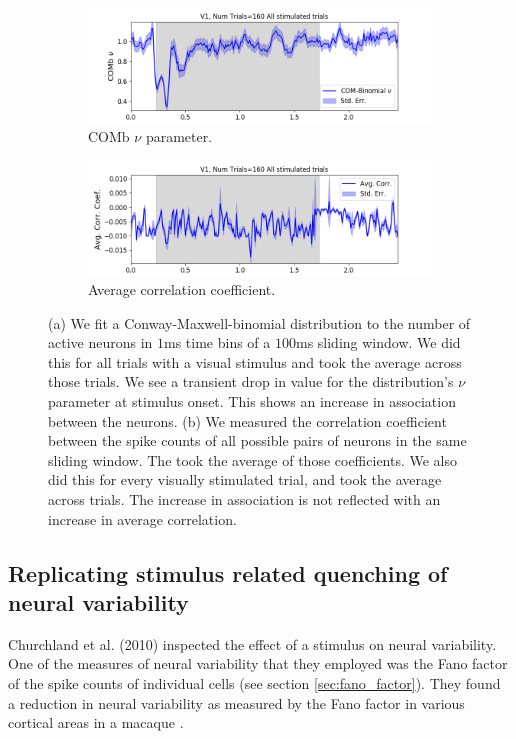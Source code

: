 \documentclass[a4paper,12pt]{article}
\theoremstyle{definition}
\begin{document}
  \newpage

  \begin{figure}[h]
    \begin{subfigure}[h]{\linewidth}
      \includegraphics[width=\linewidth]{figures/v1_1ms_comb_nu_all_stimulated_trials.png}
      \caption{COMb $\nu$ parameter.}
      \label{fig:comb_nu_parameter}
    \end{subfigure}
    \begin{subfigure}[h]{\linewidth}
      \includegraphics[width=\linewidth]{figures/v1_1ms_corr_avg_all_stimulated_trials.png}
      \caption{Average correlation coefficient.}
      \label{fig:avg_corr_coef}
    \end{subfigure}
    \caption{(a) We fit a Conway-Maxwell-binomial distribution to the number of active neurons in $1$ms time bins of a $100$ms sliding window. We did this for all trials with a visual stimulus and took the average across those trials. We see a transient drop in value for the distribution's $\nu$ parameter at stimulus onset. This shows an increase in association between the neurons. (b) We measured the correlation coefficient between the spike counts of all possible pairs of neurons in the same sliding window. The took the average of those coefficients. We also did this for every visually stimulated trial, and took the average across trials. The increase in association is not reflected with an increase in average correlation.}
    \label{fig:comb_nu_and_corr}
  \end{figure}

  \newpage

  \subsection{Replicating stimulus related quenching of neural variability}
  Churchland et al. (2010) inspected the effect of a stimulus on neural variability. One of the measures of neural variability that they employed was the Fano factor of the spike counts of individual cells (see section \ref{sec:fano_factor}). They found a reduction in neural variability as measured by the Fano factor in various cortical areas in a macaque \cite{churchland}.
\end{document}
